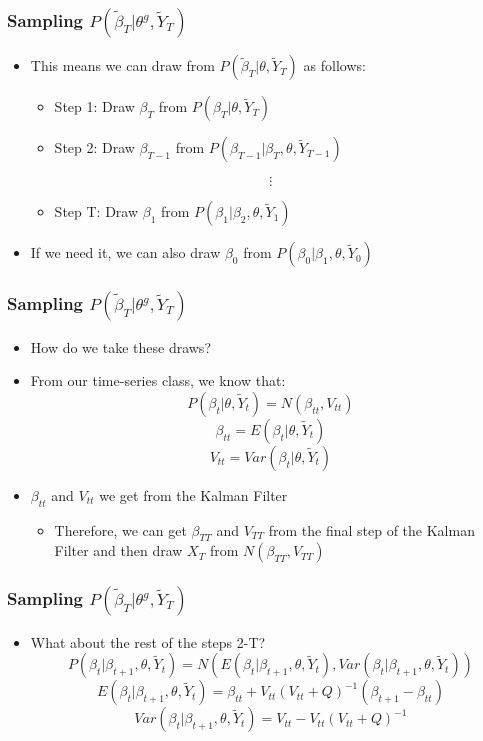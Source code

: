 \scshape\documentclass[xcolor=svgnames]{beamer}
\begin{document}
\begin{frame}
\frametitle{Sampling $P(\tilde{\beta}_T|\theta^g,\tilde{Y}_T)$}
\begin{itemize}
	\item  This means we can draw from $P(\tilde{\beta}_T|\theta,\tilde{Y}_T)$ as follows:
	\begin{itemize}
		\item  Step 1: Draw $\beta_T$ from $P(\beta_T|\theta,\tilde{Y}_T)$
		\item  Step 2: Draw $\beta_{T-1}$ from $P(\beta_{T-1}|\beta_T,\theta,\tilde{Y}_{T-1})$
	\end{itemize}
	\vspace{0.1 in}
	$$ \vdots $$
	\begin{itemize}
		\item  Step T: Draw $\beta_1$ from $P(\beta_1|\beta_2,\theta,\tilde{Y}_1)$
	\end{itemize}
	\vspace{0.1 in}
	\item If we need it, we can also draw $\beta_0$ from $P(\beta_0|\beta_1,\theta,\tilde{Y}_0)$
\end{itemize}
\end{frame}

\begin{frame}
\frametitle{Sampling $P(\tilde{\beta}_T|\theta^g,\tilde{Y}_T)$}
\begin{itemize}
	\item  How do we take these draws?
	\item  From our time-series class, we know that:	
		$$ P(\beta_t|\theta,\tilde{Y}_t)=N(\beta_{tt},V_{tt}) $$
		$$ \beta_{tt}=E(\beta_t|\theta,\tilde{Y}_t) $$
		$$ V_{tt}=Var(\beta_t|\theta,\tilde{Y}_t) $$
		
	\item  $\beta_{tt}$ and $V_{tt}$ we get from the Kalman Filter
	\begin{itemize}
		\item  Therefore, we can get $\beta_{TT}$ and $V_{TT}$ from the final step of the Kalman Filter and then draw $X_T$ from $N(\beta_{TT},V_{TT})$
	\end{itemize}
\end{itemize}
\end{frame}

\begin{frame}
\frametitle{Sampling $P(\tilde{\beta}_T|\theta^g,\tilde{Y}_T)$}
\begin{itemize}
	\item  What about the rest of the steps 2-T?
	$$ P(\beta_t|\beta_{t+1},\theta,\tilde{Y}_t)=N(E(\beta_t|\beta_{t+1},\theta,\tilde{Y}_t),Var(\beta_t|\beta_{t+1},\theta,\tilde{Y}_t)) $$
	$$ E(\beta_t|\beta_{t+1},\theta,\tilde{Y}_t)=\beta_{tt}+V_{tt}(V_{tt}+Q)^{-1}(\beta_{t+1}-\beta_{tt}) $$
	$$ Var(\beta_t|\beta_{t+1},\theta,\tilde{Y}_t)=V_{tt}-V_{tt}(V_{tt}+Q)^{-1} $$
\end{itemize}
\end{frame}
\end{document}

